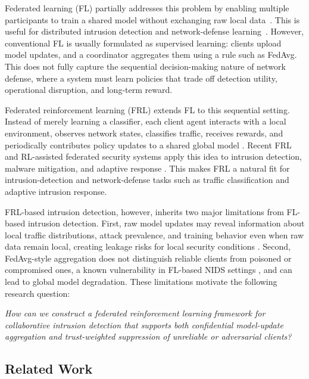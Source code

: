 \documentclass[journal]{IEEEtran}
\begin{document}
Federated learning (FL) partially addresses this problem by enabling multiple
participants to train a shared model without exchanging raw local
data~\cite{mcmahan2017fedavg,kairouz2021flsurvey}. This is useful for distributed
intrusion detection and network-defense
learning~\cite{chen2022feddef,chen2024ffids,manh2024homomorphic}. However,
conventional FL is usually formulated as supervised learning: clients upload
model updates, and a coordinator aggregates them using a rule such as FedAvg.
This does not fully capture the sequential decision-making nature of network
defense, where a system must learn policies that trade off detection utility,
operational disruption, and long-term reward.

Federated reinforcement learning (FRL) extends FL to this sequential setting.
Instead of merely learning a classifier, each client agent interacts with a
local environment, observes network states, classifies traffic, receives
rewards, and periodically contributes policy updates to a shared global model
\cite{chen2024reviewpfrl,li2024frlrl,yang2024fedprl,jing2025fmarlsurvey}.
Recent FRL and RL-assisted federated security systems apply this idea to
intrusion detection, malware mitigation, and adaptive response
\cite{vadigi2023frlids,feng2025cyberforce,kaur2025drrlflids}.
This makes FRL a natural fit for intrusion-detection and network-defense tasks 
such as traffic classification and adaptive intrusion response.

FRL-based intrusion detection, however, inherits two major limitations from
FL-based intrusion detection. First, raw model updates may reveal information about
local traffic distributions, attack prevalence, and training behavior even when
raw data remain local, creating leakage risks for local security conditions
\cite{chen2022feddef,chen2024ffids,hua2026privacy}. Second, FedAvg-style
aggregation does not distinguish reliable clients from poisoned or compromised
ones, a known vulnerability in FL-based NIDS settings
\cite{nguyen2020poisoningflnids,zhang2022secfednids,sun2024fedmade}, and can lead
to global model degradation. These limitations motivate the following research question:

\emph{How can we construct a federated reinforcement learning framework for collaborative
intrusion detection that supports both confidential model-update aggregation and trust-weighted
suppression of unreliable or adversarial clients?}

\subsection{Related Work}\label{sec:related_work}
\end{document}
